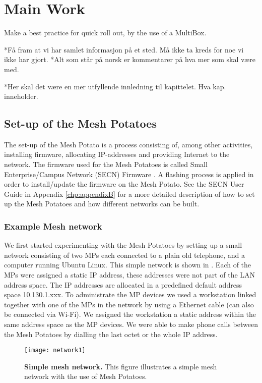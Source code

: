 \chapter{Main Work}
\label{chp:quickrollout} 

Make a best practice for quick roll out, by the use of a MultiBox. 

*Få fram at vi har samlet informasjon på et sted. Må ikke ta kreds for noe vi ikke har gjort. 
*Alt som står på norsk er kommentarer på hva mer som skal være med.

*Her skal det være en mer utfyllende innledning til kapittelet. Hva kap. inneholder.


\section{Set-up of the Mesh Potatoes}
The set-up of the Mesh Potato is a process consisting of, among other activities, installing firmware, allocating IP-addresses and providing Internet to the network. The firmware used for the Mesh Potatoes is called Small Enterprise/Campus Network (SECN) Firmware \cite{ChoosingFirmware}. A flashing process is applied in order to install/update the firmware on the Mesh Potato. See the SECN User Guide in Appendix \ref{chp:appendixB} for a more detailed description of how to set up the Mesh Potatoes and how different networks can be built. 

\subsection{Example Mesh network}
We first started experimenting with the Mesh Potatoes by setting up a small network consisting of two MPs each connected to a plain old telephone, and a computer running Ubuntu Linux. This simple network is shown in . Each of the MPs were assigned a static IP address, these addresses were not part of the LAN address space. The IP addresses are allocated in a predefined default address space 10.130.1.xxx. To administrate the MP devices we used a workstation linked together with one of the MPs in the network by using a Ethernet cable (can also be connected via Wi-Fi). We assigned the workstation a static address within the same address space as the MP devices. We were able to make phone calls between the Mesh Potatoes by dialling the last octet or the whole IP address.

\begin{figure}[t]
  \centering
      \texttt{[image: network1]}
  \caption [Example of a simple mesh network]{\textbf{Simple mesh network.} This figure illustrates a simple mesh network with the use of Mesh Potatoes.}
  \label{fig:network}
\end{figure}


